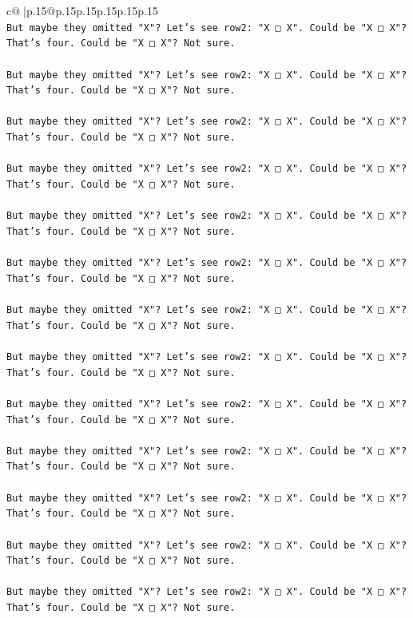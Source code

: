 \documentclass{article}
\begin{document}
{\begin{supertabular}{c@{$\;$}|p{.15\linewidth}@{}p{.15\linewidth}p{.15\linewidth}p{.15\linewidth}p{.15\linewidth}p{.15\linewidth}}
{{{\\ 
\texttt{But maybe they omitted "X"? Let's see row2: "X □ X". Could be "X □ X"? That's four. Could be "X □ X"? Not sure.} \\
\\ 
\texttt{But maybe they omitted "X"? Let's see row2: "X □ X". Could be "X □ X"? That's four. Could be "X □ X"? Not sure.} \\
\\ 
\texttt{But maybe they omitted "X"? Let's see row2: "X □ X". Could be "X □ X"? That's four. Could be "X □ X"? Not sure.} \\
\\ 
\texttt{But maybe they omitted "X"? Let's see row2: "X □ X". Could be "X □ X"? That's four. Could be "X □ X"? Not sure.} \\
\\ 
\texttt{But maybe they omitted "X"? Let's see row2: "X □ X". Could be "X □ X"? That's four. Could be "X □ X"? Not sure.} \\
\\ 
\texttt{But maybe they omitted "X"? Let's see row2: "X □ X". Could be "X □ X"? That's four. Could be "X □ X"? Not sure.} \\
\\ 
\texttt{But maybe they omitted "X"? Let's see row2: "X □ X". Could be "X □ X"? That's four. Could be "X □ X"? Not sure.} \\
\\ 
\texttt{But maybe they omitted "X"? Let's see row2: "X □ X". Could be "X □ X"? That's four. Could be "X □ X"? Not sure.} \\
\\ 
\texttt{But maybe they omitted "X"? Let's see row2: "X □ X". Could be "X □ X"? That's four. Could be "X □ X"? Not sure.} \\
\\ 
\texttt{But maybe they omitted "X"? Let's see row2: "X □ X". Could be "X □ X"? That's four. Could be "X □ X"? Not sure.} \\
\\ 
\texttt{But maybe they omitted "X"? Let's see row2: "X □ X". Could be "X □ X"? That's four. Could be "X □ X"? Not sure.} \\
\\ 
\texttt{But maybe they omitted "X"? Let's see row2: "X □ X". Could be "X □ X"? That's four. Could be "X □ X"? Not sure.} \\
\\ 
\texttt{But maybe they omitted "X"? Let's see row2: "X □ X". Could be "X □ X"? That's four. Could be "X □ X"? Not sure.} \\
}}}
\end{supertabular}}
\end{document}
